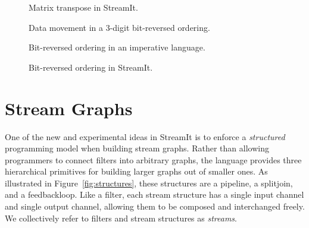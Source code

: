 \begin{figure}[t]
\centering
{}
\caption{Matrix transpose in StreamIt.\protect\label{fig:transpose}}
\end{figure}

\begin{figure}[t]
\vspace{0.3\baselineskip}
\centering
\begin{minipage}{2.5in}
\centering
{}
\end{minipage}
\hspace{0.5in}
\begin{minipage}{3in}
\centering
{}
\end{minipage}

\begin{minipage}{2.5in}
\caption{Data movement in a 3-digit bit-reversed ordering.\protect\label{fig:bitreverse-pattern}}
\end{minipage}
\hspace{0.5in}
\begin{minipage}{3in}
\centering
\caption{Bit-reversed ordering in an imperative language.\protect\label{fig:bitreverse-c}}
\end{minipage}

\end{figure}

\begin{figure}[t]
\centering
{}
\caption{Bit-reversed ordering in StreamIt.\protect\label{fig:bitreverse-streamit}}
\end{figure}

\section{Stream Graphs}
\enlargethispage{\baselineskip}

One of the new and experimental ideas in StreamIt is to enforce a {\it
  structured} programming model when building stream graphs.  Rather
than allowing programmers to connect filters into arbitrary graphs,
the language provides three hierarchical primitives for building
larger graphs out of smaller ones.  As illustrated in
Figure~\ref{fig:structures}, these structures are a pipeline, a
splitjoin, and a feedbackloop.  Like a filter, each stream structure
has a single input channel and single output channel, allowing them to
be composed and interchanged freely.  We collectively refer to filters
and stream structures as {\it streams}.

